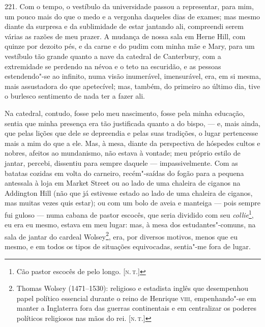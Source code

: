 221. Com o tempo, o vestíbulo da universidade passou a representar, para
mim, um pouco mais do que o medo e a vergonha daqueles dias de exames;
mas mesmo diante da surpresa e da sublimidade de estar jantando ali,
compreendi serem várias as razões de meu prazer. A mudança de nossa sala
em Herne Hill, com quinze por dezoito pés, e da carne e do pudim com
minha mãe e Mary, para um vestíbulo tão grande quanto a nave da catedral
de Canterbury, com a extremidade se perdendo na névoa e o teto na
escuridão, e as pessoas estendendo"-se ao infinito, numa visão
inumerável, imensurável, era, em si mesma, mais assustadora do que
apetecível; mas, também, do primeiro ao último dia, tive o burlesco
sentimento de nada ter a fazer ali.

Na catedral, contudo, fosse pelo meu nascimento, fosse pela minha
educação, sentia que minha presença era tão justificada quanto a do
bispo, --- e, mais ainda, que pelas lições que dele se depreendia e pelas
suas tradições, o lugar pertencesse mais a mim do que a ele. Mas, à
mesa, diante da perspectiva de hóspedes cultos e nobres, afeitos ao
mundanismo, não estava à vontade; meu próprio estilo de jantar, percebi,
dissentiu para sempre daquele --- impassivelmente. Com as batatas cozidas
em volta do carneiro, recém"-saídas do fogão para a pequena antessala à
loja em Market Street ou ao lado de uma chaleira de ciganos na Addington
Hill (não que já estivesse estado ao lado de uma chaleira de ciganos,
mas muitas vezes quis estar); ou com um bolo de aveia e manteiga --- pois
sempre fui guloso --- numa cabana de pastor escocês, que seria dividido
com seu \emph{collie}\footnote{Cão pastor escocês de pelo longo. {[}\textsc{n.\,t.}{]}}, eu era eu mesmo, estava em meu lugar: mas, à mesa dos
estudantes"-comuns, na sala de jantar do cardeal Wolsey\footnote{Thomas
  Wolsey (1471--1530): religioso e estadista inglês que desempenhou papel
  político essencial durante o reino de Henrique \textsc{viii}, empenhando"-se em
  manter a Inglaterra fora das guerras continentais e em centralizar os
  poderes políticos religiosos nas mãos do rei. {[}\textsc{n.\,t.}{]}}, era,
por diversos motivos, menos que eu mesmo, e em todos os tipos de
situações equivocadas, sentia"-me fora de lugar.

